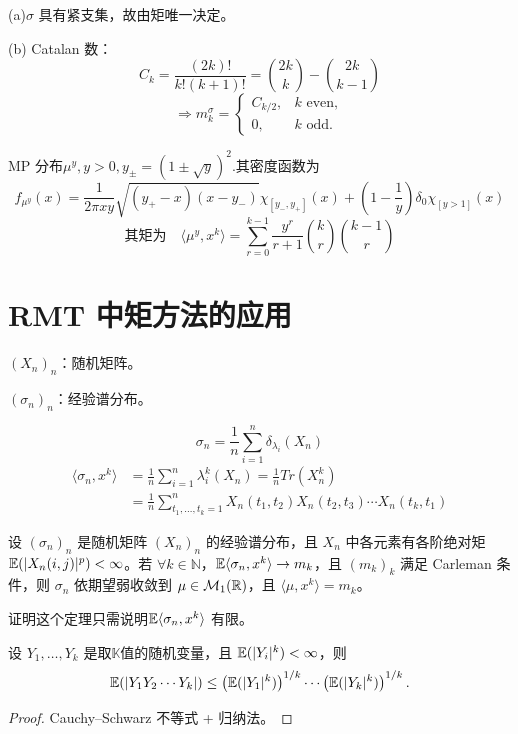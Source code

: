 \begin{remark}

(a)$\sigma$ 具有紧支集，故由矩唯一决定。

(b) Catalan 数：
\[
C_k = \frac{(2k)!}{k!(k+1)!} = \binom{2k}{k} - \binom{2k}{k-1}
\]
\[
\Rightarrow m_k^\sigma = 
\begin{cases} 
C_{k/2}, & k \text{ even}, \\
0, & k \text{ odd}.
\end{cases}
\]
\end{remark}


MP 分布$\mu^y, y>0,y_\pm = (1 \pm \sqrt{y})^2$.其密度函数为
\[
f_{\mu^y}(x) = \frac{1}{2\pi x y} \sqrt{(y_+ - x)(x - y_-)} \chi_{[y_-, y_+]}(x) + \left(1 - \frac{1}{y}\right) \delta_0 \chi_{[y>1]}(x)
\]
\[
\text{其矩为}\quad\langle \mu^y, x^k \rangle = \sum_{r=0}^{k-1} \frac{y^r}{r+1} \binom{k}{r} \binom{k-1}{r}
\]

\section{RMT 中矩方法的应用}

$(X_n)_n$：随机矩阵。

$(\sigma_n)_n$：经验谱分布。

\[
 \sigma_n = \frac{1}{n} \sum_{i=1}^{n} \delta_{\lambda_i}(X_n)
\]
\begin{equation*}
    \begin{aligned}
        \langle \sigma_n, x^k \rangle & = \frac{1}{n} \sum_{i=1}^{n} \lambda_i^k(X_n)= \frac{1}{n} Tr(X_n^k)\\
        & = \frac{1}{n} \sum_{t_1, \ldots, t_k=1}^{n} X_n(t_1, t_2) X_n(t_2, t_3) \cdots X_n(t_k, t_1)
    \end{aligned}
\end{equation*}


\begin{theorem}
设 $(\sigma_n)_n$ 是随机矩阵 $(X_n)_n$ 的经验谱分布，且 $X_n$ 中各元素有各阶绝对矩 $\mathbb{E}(|X_n(i,j)|^p) < \infty$。若 $\forall k \in \mathbb{N}$，$\mathbb{E} \langle \sigma_n, x^k \rangle \to m_k$，且 $(m_k)_k$ 满足 Carleman 条件，则 $\sigma_n$ 依期望弱收敛到 $\mu \in \mathcal{M}_1(\mathbb{R})$，且 $\langle \mu, x^k \rangle = m_k$。

\end{theorem}
证明这个定理只需说明$\mathbb{E} \langle \sigma_n, x^k \rangle$ 有限。

\begin{lemma}
   设 $Y_1, \ldots, Y_k$ 是取$\mathbb{K}$值的随机变量，且 $\mathbb{E}(|Y_i|^k) < \infty$，则
\[
\mathbb{E}(|Y_1 Y_2 \cdots Y_k|) \leq \left(\mathbb{E}(|Y_1|^k)\right)^{1/k} \cdots \left(\mathbb{E}(|Y_k|^k)\right)^{1/k}.
\]
\end{lemma}
\begin{proof}
    Cauchy–Schwarz 不等式 + 归纳法。
\end{proof}

